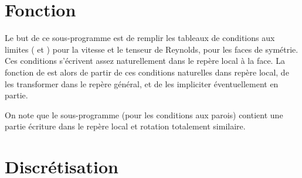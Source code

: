 %
%
%
%
%
%
%
%


\vspace{1cm}
\section{Fonction}
Le but de ce sous-programme est de remplir les tableaux de conditions aux
limites ( et ) pour la vitesse et le tenseur de Reynolds,
pour les faces de sym\'etrie. Ces conditions s'\'ecrivent assez
naturellement dans le rep\`ere local \`a la face. La fonction de 
est alors de partir de ces conditions naturelles dans rep\`ere local, de les
transformer dans le rep\`ere g\'en\'eral, et de les impliciter \'eventuellement
en partie.

On note que le sous-programme  (pour les conditions aux parois)
contient une partie \'ecriture dans
le rep\`ere local et rotation totalement similaire.

\section{Discr\'etisation}

